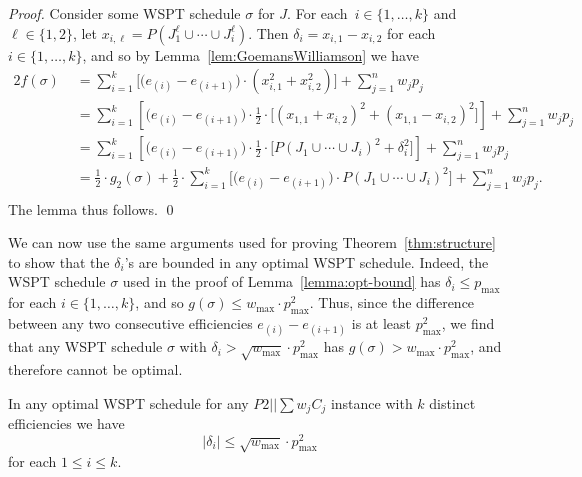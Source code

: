 \documentclass[11pt]{llncs}
\begin{document}
\begin{proof}
Consider some WSPT schedule $\sigma$ for $J$. For each~$i \in \{1,\ldots,k\}$ and $\ell \in \{1,2\}$, let $x_{i,\ell} = P(J^\ell_1 \cup \cdots \cup J^\ell_i)$. Then $\delta_i = x_{i,1} - x_{i,2}$ for each~$i \in \{1,\ldots,k\}$, and so by Lemma~\ref{lem:GoemansWilliamson} we have
\begin{align*}
2 f(\sigma) \,\,&= \sum_{i = 1}^{k}  \Big[ \big(e_{(i)}-e_{(i+1)}\big)  \cdot (x^2_{i,1}+x^2_{i,2}) \Big] +  \sum^n_{j=1} w_j p_j \\ 
&= \sum_{i = 1}^{k}  \left[ \big(e_{(i)}-e_{(i+1)}\big)  \cdot \frac{1}{2} \cdot  \Big[ (x_{1,1}  + x_{i,2})^2 + (x_{1,1}  - x_{i,2})^2  \Big] \right] +  \sum^n_{j=1} w_j p_j\\
&= \sum_{i = 1}^{k}  \left[ \big(e_{(i)}-e_{(i+1)}\big)  \cdot \frac{1}{2} \cdot  \Big[ P(J_1 \cup \cdots \cup J_i)^2 + \delta^2_i  \Big] \right] +  \sum^n_{j=1} w_j p_j\\
&= \frac{1}{2} \cdot g_2(\sigma) + \frac{1}{2} \cdot \sum_{i = 1}^{k}  \Big[ \big(e_{(i)}-e_{(i+1)}\big)  \cdot P(J_1 \cup \cdots \cup J_i)^2 \Big] + \sum^n_{j=1} w_j p_j. \\ 
\end{align*}
The lemma thus follows. \qed
\end{proof}

We can now use the same arguments used for proving Theorem~\ref{thm:structure} to show that the $\delta_i$'s are bounded in any optimal WSPT schedule. Indeed, the WSPT schedule $\sigma$ used in the proof of Lemma~\ref{lemma:opt-bound} has $\delta_i \leq p_{\max}$ for each $i \in \{1,\ldots,k\}$, and so $g(\sigma) \leq w_{\max} \cdot p_{\max}^2$. Thus, since the difference between any two consecutive efficiencies $e_{(i)}-e_{(i+1)}$ is at least $p^2_{\max}$, we find that any WSPT schedule $\sigma$ with $\delta_i > \sqrt{w_{\max}} \cdot p^2_{\max}$ has $g(\sigma) > w_{\max} \cdot p_{\max}^2$, and therefore cannot be optimal. 


\begin{theorem}
\label{thm:structure2}
In any optimal WSPT schedule for any $P2||\sum w_j C_j$ instance with $k$ distinct efficiencies we have 
$$
|\delta_i| \leq  \sqrt{w_{\max}} \cdot p_{\max}^2
$$ 
for each $1 \leq i \leq k$.    
\end{theorem}
\end{document}
